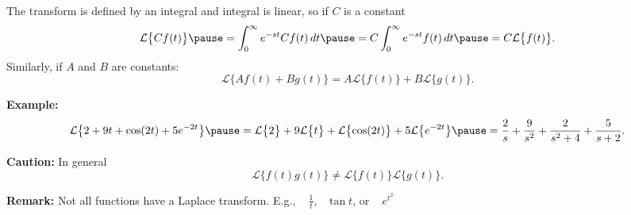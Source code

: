 \documentclass[10pt,aspectratio=169]{beamer}
\begin{document}
\begin{frame}
The transform is defined by an integral and integral is linear, so
if $C$ is a constant
\begin{equation*}
\mathcal{L} \bigl\{ C f(t) \bigr\}
\pause
=
\int_0^\infty e^{-st} C f(t) \,dt
\pause
=
C \int_0^\infty e^{-st} f(t) \,dt
\pause
=
C \mathcal{L} \bigl\{ f(t) \bigr\} .
\end{equation*}
\pause
Similarly, if $A$ and $B$ are constants:
\begin{equation*}
\mathcal{L} \bigl\{ A f(t) + B g(t) \bigr\} =
A \mathcal{L} \bigl\{ f(t) \bigr\} +
B \mathcal{L} \bigl\{ g(t) \bigr\} .
\end{equation*}


\medskip
\pause

\textbf{Example:}
\[
\mathcal{L} \bigl\{
2 + 9t + \cos(2t) + 5 e^{-2t}
\bigr\}
\pause
=
\mathcal{L} \bigl\{
2
\bigr\}
+ 9
\mathcal{L} \bigl\{
t
\bigr\}
+
\mathcal{L} \bigl\{
\cos(2t)
\bigr\}
+ 5
\mathcal{L} \bigl\{
e^{-2t}
\bigr\}
\pause
=
\frac{2}{s}
+
\frac{9}{s^2}
+
\frac{2}{s^2+4}
+
\frac{5}{s+2} .
\]
\pause

\textbf{Caution:}
In general 
\begin{equation*}
\mathcal{L} \bigl\{ f(t) g(t) \bigr\} \not=
\mathcal{L} \bigl\{ f(t) \bigr\}
\mathcal{L} \bigl\{ g(t) \bigr\} .
\end{equation*}

\medskip
\pause

\textbf{Remark:}
Not all functions have a Laplace transform. \quad E.g.,
~
$\frac{1}{t}$, ~$\tan t$, or ~ $e^{t^2}$

\end{frame}
\end{document}

